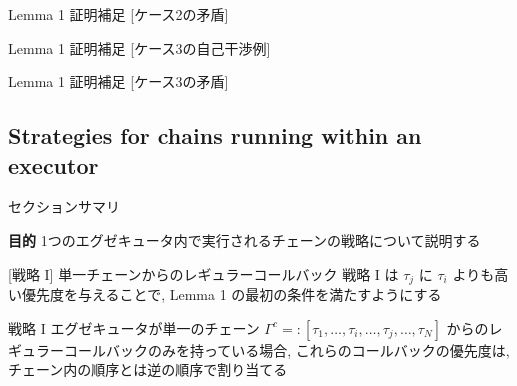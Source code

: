{    \begin{frame}{Lemma 1 証明補足 [ケース2の矛盾]}
    \end{frame}

    \begin{frame}{Lemma 1 証明補足 [ケース3の自己干渉例]}
    \end{frame}

    \begin{frame}{Lemma 1 証明補足 [ケース3の矛盾]}
    \end{frame}
}


\subsection{Strategies for chains running within an executor}
\label{ssec: strategies for chains running within an executor}

\begin{frame}{セクションサマリ}
    \begin{itembox}[l]{\textbf{目的}}
        1つのエグゼキュータ内で実行されるチェーンの戦略について説明する
    \end{itembox}
\end{frame}

\begin{frame}{}
\end{frame}

\begin{frame}[label=strategy1]{[戦略 I] 単一チェーンからのレギュラーコールバック}
    戦略 I は $\tau_{j}$ に $\tau_{i}$ よりも高い優先度を与えることで, Lemma 1 の最初の条件を満たすようにする
    \begin{block}{戦略 I}
        エグゼキュータが単一のチェーン $\Gamma^{c}=:\left[\tau_{1}, \ldots, \tau_{i}, \ldots, \tau_{j}, \ldots, \tau_{N}\right]$ からのレギュラーコールバックのみを持っている場合, これらのコールバックの優先度は, チェーン内の順序とは逆の順序で割り当てる
    \end{block}
\end{frame}

